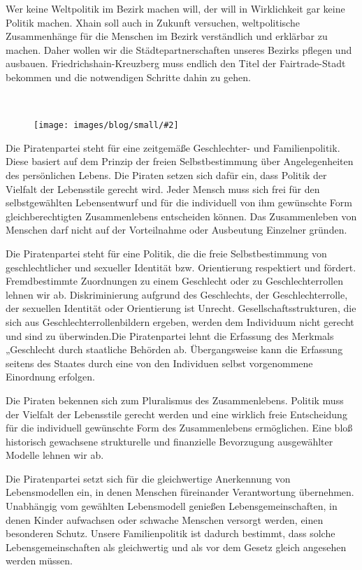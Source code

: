 \documentclass[a4paper,10pt]{article}
\newcommand{\mysection}[1]{{\vspace{1cm}\noindent\color{gray}{\ttfamily\LARGE\raggedright #1}\\\medskip}}
\newcommand{\abschnitt}[2]{%
\mysection{\raggedright #1}%
\begin{figure}[t]%
\vspace*{-2.7cm}%
\hspace*{-2.1cm}%
\texttt{[image: images/blog/small/\#2]} %
\end{figure}%
}
\newcommand{\bottomfigure}[1]{
\parbox{5cm}{
\vspace*{1cm}%
\texttt{[image: ./images/blog/small/\#1]}
}
}
\begin{document}
Wer keine Weltpolitik im Bezirk machen will, der will in Wirklichkeit
gar keine Politik machen. Xhain soll auch in Zukunft versuchen,
weltpolitische Zusammenhänge für die Menschen im Bezirk verständlich und
erklärbar zu machen. Daher wollen wir die Städtepartnerschaften unseres
Bezirks pflegen und ausbauen. Friedrichshain-Kreuzberg muss endlich den
Titel der Fairtrade-Stadt bekommen und die notwendigen Schritte dahin zu
gehen.


\clearpage
\abschnitt{\raggedright Geschlechter- {\raisebox{-.5cm}{~}} und 
\mbox{Familienpolitik}}{MutterMutterKind.png}

Die Piratenpartei steht für eine zeitgemäße Geschlechter- und
Familienpolitik. Diese basiert auf dem Prinzip der freien
Selbstbestimmung über Angelegenheiten des persönlichen Lebens. Die
Piraten setzen sich dafür ein, dass Politik der Vielfalt der Lebensstile
gerecht wird. Jeder Mensch muss sich frei für den selbstgewählten
Lebensentwurf und für die individuell von ihm gewünschte Form
gleichberechtigten Zusammenlebens entscheiden können. Das Zusammenleben
von Menschen darf nicht auf der Vorteilnahme oder Ausbeutung Einzelner
gründen.

\enlargethispage{-1em}
Die Piratenpartei steht für eine Politik, die die freie Selbstbestimmung
von geschlechtlicher und sexueller Identität bzw. Orientierung
respektiert und fördert. Fremdbestimmte Zuordnungen zu einem Geschlecht
oder zu Geschlechterrollen lehnen wir ab. Diskriminierung aufgrund des
Geschlechts, der Geschlechterrolle, der sexuellen Identität oder
Orientierung ist Unrecht. Gesellschaftsstrukturen, die sich aus
Geschlechterrollenbildern ergeben, werden dem Individuum nicht gerecht
und sind zu überwinden.Die Piratenpartei lehnt die Erfassung des
Merkmals „Geschlecht{\grqq} durch staatliche Behörden ab. Übergangsweise kann
die Erfassung seitens des Staates durch eine von den Individuen selbst
vorgenommene Einordnung erfolgen.

Die Piraten bekennen sich zum Pluralismus des Zusammenlebens. Politik
muss der Vielfalt der Lebensstile gerecht werden und eine wirklich freie
Entscheidung für die individuell gewünschte Form des Zusammenlebens
ermöglichen. Eine bloß historisch gewachsene strukturelle und
finanzielle Bevorzugung ausgewählter Modelle lehnen wir ab.

Die Piratenpartei setzt sich für die gleichwertige Anerkennung von
Lebensmodellen ein, in denen Menschen füreinander Verantwortung
übernehmen. Unabhängig vom gewählten Lebensmodell genießen
Lebensgemeinschaften, in denen Kinder aufwachsen oder schwache Menschen
versorgt werden, einen besonderen Schutz. Unsere Familienpolitik ist
dadurch bestimmt, dass solche Lebensgemeinschaften als gleichwertig und
als vor dem Gesetz gleich angesehen werden müssen.
\end{document}
